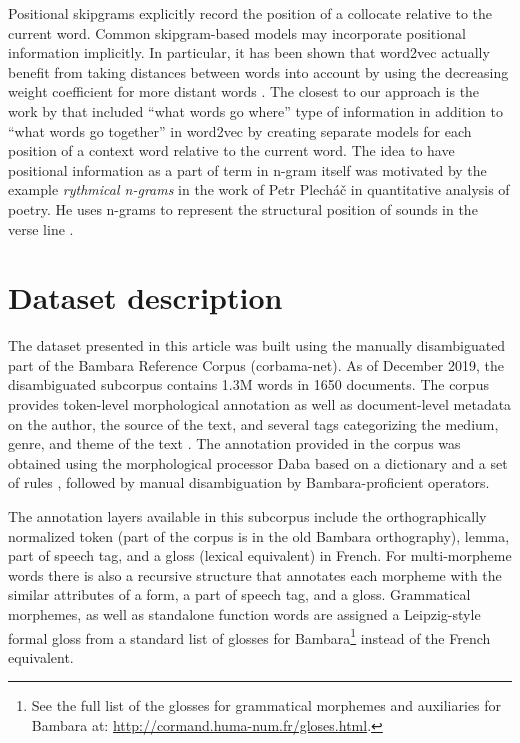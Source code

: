\documentclass[12pt]{article}
\begin{document}
Positional skipgrams explicitly record the position of a collocate
relative to the current word. Common skipgram-based models may
incorporate positional information implicitly. In particular, it has
been shown that word2vec actually benefit from taking distances
between words into account by using the decreasing weight coefficient
for more distant words \autocite{levy-etal-2015-improving}. The
closest to our approach is the work by \textcite{ling-etal-2015-two}
that included “what words go where” type of information in addition to
“what words go together” in word2vec by creating separate models for
each position of a context word relative to the current word.  The
idea to have positional information as a part of term in n-gram itself
was motivated by the example \textit{rythmical n-grams} in the work of
Petr Plech\'a\v{c} in quantitative analysis of poetry. He uses n-grams
to represent the structural position of sounds in the verse line
\autocite[38]{plechac2019}.

\section{Dataset description}
\label{sec:data}

The dataset presented in this article was built using the manually
disambiguated part of the Bambara Reference Corpus (corbama-net). As
of December 2019, the disambiguated subcorpus contains 1.3M words in
1650 documents. The corpus provides token-level morphological
annotation as well as document-level metadata on the author, the
source of the text, and several tags categorizing the medium, genre,
and theme of the text \autocite[on metadata, see for
details:][]{davydov2010towards}. The annotation provided in the corpus
was obtained using the morphological processor Daba based on a
dictionary and a set of rules \autocite{maslinsky2014daba}, followed
by manual disambiguation by Bambara-proficient
operators.

The annotation layers available in this subcorpus include the
orthographically normalized token (part of the corpus is in the
old Bambara orthography), lemma, part of speech
tag, and a gloss (lexical equivalent) in French. For multi-morpheme
words there is also a recursive structure that annotates each morpheme
with the similar attributes of a form, a part of speech tag, and a
gloss. Grammatical morphemes, as well as standalone function words are
assigned a Leipzig-style formal gloss from a standard list of glosses
for Bambara\footnote{See the full list of the glosses for grammatical
  morphemes and auxiliaries for Bambara at:
  \url{http://cormand.huma-num.fr/gloses.html}.} instead of the French
equivalent.
\end{document}
